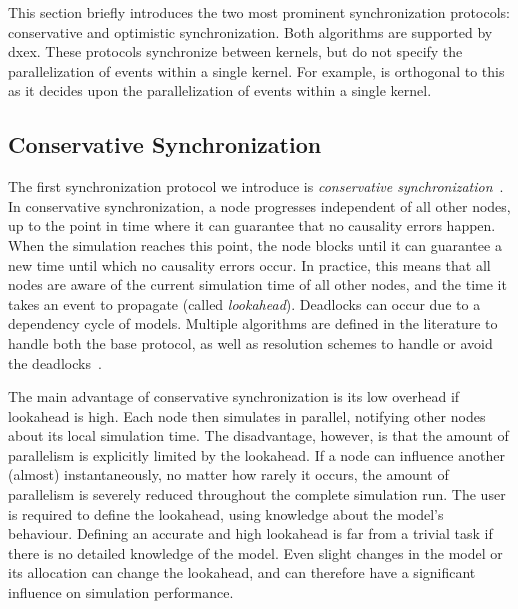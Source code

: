 This section briefly introduces the two most prominent synchronization protocols: conservative and optimistic synchronization.
Both algorithms are supported by dxex. 
These protocols synchronize between kernels, but do not specify the parallelization of events within a single kernel.
For example, \pSim is orthogonal to this as it decides upon the parallelization of events within a single kernel.

\subsection{Conservative Synchronization}
The first synchronization protocol we introduce is \textit{conservative synchronization}~\cite{FujimotoBook}.
In conservative synchronization, a node progresses independent of all other nodes, up to the point in time where it can guarantee that no causality errors happen.
When the simulation reaches this point, the node blocks until it can guarantee a new time until which no causality errors occur.
In practice, this means that all nodes are aware of the current simulation time of all other nodes, and the time it takes an event to propagate (called \textit{lookahead}).
Deadlocks can occur due to a dependency cycle of models.
Multiple algorithms are defined in the literature to handle both the base protocol, as well as resolution schemes to handle or avoid the deadlocks~\cite{FujimotoBook}.

The main advantage of conservative synchronization is its low overhead if lookahead is high.
Each node then simulates in parallel, notifying other nodes about its local simulation time.
The disadvantage, however, is that the amount of parallelism is explicitly limited by the lookahead.
If a node can influence another (almost) instantaneously, no matter how rarely it occurs, the amount of parallelism is severely reduced throughout the complete simulation run.
The user is required to define the lookahead, using knowledge about the model's behaviour.
Defining an accurate and high lookahead is far from a trivial task if there is no detailed knowledge of the model.
Even slight changes in the model or its allocation can change the lookahead, and can therefore have a significant influence on simulation performance.

